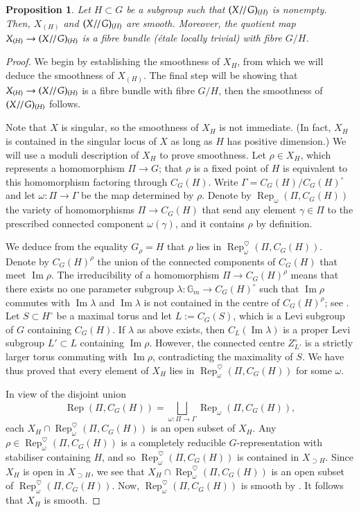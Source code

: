 \documentclass[11pt,oneside,dvipsnames]{amsart}
\theoremstyle{plain}
\newtheorem{Prop}[Thm]{Proposition}
\theoremstyle{definition}
\theoremstyle{named}
\DeclareMathOperator{\Ima}{Im}
\DeclareMathOperator{\Rep}{Rep}
\DeclareMathOperator{\ds}{\!/\mkern-2mu/\mkern-2mu}
\begin{document}
\begin{Prop}\label{Prop-sm-str}
Let $H\subset G$ be a subgroup such that $(X\ds G)_{(H)}$ is nonempty. Then, $X_{(H)}$ and $(X\ds G)_{(H)}$ are smooth. Moreover, the quotient map $X_{(H)}\rightarrow(X\ds G)_{(H)}$ is a fibre bundle (\'etale locally trivial) with fibre $G/H$.
\end{Prop}
\begin{proof}
We begin by establishing the smoothness of $X_H$, from which we will deduce the smoothness of $X_{(H)}$. The final step will be showing that $X_{(H)}\rightarrow(X\ds G)_{(H)}$ is a fibre bundle with fibre $G/H$, then the smoothness of $(X\ds G)_{(H)}$ follows.

Note that $X$ is singular, so the smoothness of $X_H$ is not immediate. (In fact, $X_H$ is contained in the singular locus of $X$ as long as $H$ has positive dimension.) We will use a moduli description of $X_H$ to prove smoothness. Let $\rho\in X_H$, which represents a homomorphism $\Pi\rightarrow G$; that $\rho$ is a fixed point of $H$ is equivalent to this homomorphism factoring through $C_G(H)$. Write $\Gamma=C_G(H)/C_G(H)^{\circ}$ and let $\omega:\Pi\rightarrow\Gamma$ be the map determined by $\rho$. Denote by $\Rep_{\omega}(\Pi,C_G(H))$ the variety of homomorphisms $\Pi\rightarrow C_G(H)$ that send any element $\gamma\in\Pi$ to the prescribed connected component $\omega(\gamma)$, and it contains $\rho$ by definition. 

We deduce from the equality $G_{\rho}=H$ that $\rho$ lies in $\Rep_{\omega}^{\heartsuit}(\Pi,C_G(H))$. Denote by $C_{G}(H)^{\rho}$ the union of the connected components of $C_G(H)$ that meet $\Ima\rho$. The irreducibility of a homomorphism $\Pi\rightarrow C_G(H)^{\rho}$ means that there exists no one parameter subgroup $\lambda:\mathbb{G}_m\rightarrow C_G(H)^{\circ}$  such that $\Ima\rho$ commutes with $\Ima\lambda$ and $\Ima\lambda$ is not contained in the centre of $C_G(H)^{\rho}$; see \cite[\S 2.1 and \S 3.1]{Shu4}. Let $S\subset H^{\circ}$ be a maximal torus and let $L:=C_G(S)$, which is a Levi subgroup of $G$ containing $C_G(H)$. If $\lambda$ as above exists, then $C_L(\Ima\lambda)$ is a proper Levi subgroup $L'\subset L$ containing $\Ima\rho$. However, the connected centre $Z_{L'}^{\circ}$ is a strictly larger torus commuting with $\Ima\rho$, contradicting the maximality of $S$. We have thus proved that every element of $X_H$ lies in $\Rep_{\omega}^{\heartsuit}(\Pi,C_G(H))$ for some $\omega$. 

In view of the disjoint union
$$
\Rep(\Pi,C_G(H))=\bigsqcup_{\omega:\Pi\rightarrow\Gamma}\Rep_{\omega}(\Pi,C_G(H)),
$$
each $X_H\cap \Rep_{\omega}^{\heartsuit}(\Pi,C_G(H))$ is an open subset of $X_H$. Any $\rho\in\Rep^{\heartsuit}_{\omega}(\Pi,C_{G}(H))$ is a completely reducible $G$-representation with stabiliser containing $H$, and so $\Rep^{\heartsuit}_{\omega}(\Pi,C_{G}(H))$ is contained in $X_{\supset H}$. Since $X_H$ is open in $X_{\supset H}$, we see that $X_H\cap \Rep_{\omega}^{\heartsuit}(\Pi,C_G(H))$ is an open subset of $\Rep_{\omega}^{\heartsuit}(\Pi,C_G(H))$. Now, $\Rep^{\heartsuit}_{\omega}(\Pi,C_{G}(H))$ is smooth by \cite[Proposition 4.1]{Shu4}. It follows that $X_H$ is smooth.


\end{proof}
\end{document}
